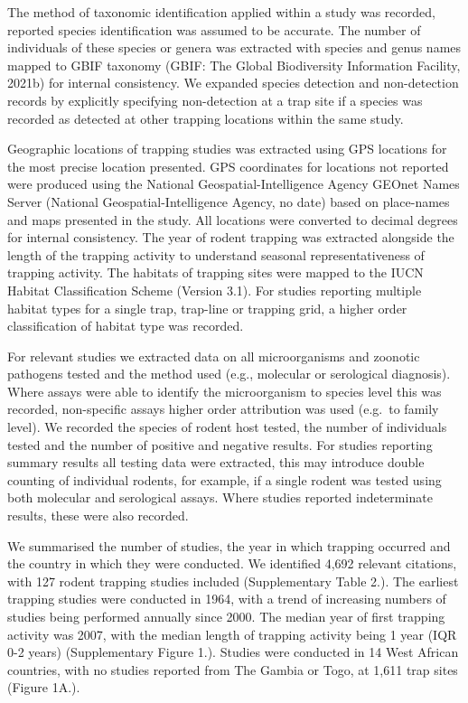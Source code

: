\documentclass[
]{article}
\begin{document}
The method of taxonomic identification applied within a study was
recorded, reported species identification was assumed to be accurate.
The number of individuals of these species or genera was extracted with
species and genus names mapped to GBIF taxonomy (GBIF: The Global
Biodiversity Information Facility, 2021b) for internal consistency. We
expanded species detection and non-detection records by explicitly
specifying non-detection at a trap site if a species was recorded as
detected at other trapping locations within the same study.

Geographic locations of trapping studies was extracted using GPS
locations for the most precise location presented. GPS coordinates for
locations not reported were produced using the National
Geospatial-Intelligence Agency GEOnet Names Server (National
Geospatial-Intelligence Agency, no date) based on place-names and maps
presented in the study. All locations were converted to decimal degrees
for internal consistency. The year of rodent trapping was extracted
alongside the length of the trapping activity to understand seasonal
representativeness of trapping activity. The habitats of trapping sites
were mapped to the IUCN Habitat Classification Scheme (Version 3.1). For
studies reporting multiple habitat types for a single trap, trap-line or
trapping grid, a higher order classification of habitat type was
recorded.

For relevant studies we extracted data on all microorganisms and
zoonotic pathogens tested and the method used (e.g., molecular or
serological diagnosis). Where assays were able to identify the
microorganism to species level this was recorded, non-specific assays
higher order attribution was used (e.g.~to family level). We recorded
the species of rodent host tested, the number of individuals tested and
the number of positive and negative results. For studies reporting
summary results all testing data were extracted, this may introduce
double counting of individual rodents, for example, if a single rodent
was tested using both molecular and serological assays. Where studies
reported indeterminate results, these were also recorded.

We summarised the number of studies, the year in which trapping occurred
and the country in which they were conducted. We identified 4,692
relevant citations, with 127 rodent trapping studies included
(Supplementary Table 2.). The earliest trapping studies were conducted
in 1964, with a trend of increasing numbers of studies being performed
annually since 2000. The median year of first trapping activity was
2007, with the median length of trapping activity being 1 year (IQR 0-2
years) (Supplementary Figure 1.). Studies were conducted in 14 West
African countries, with no studies reported from The Gambia or Togo, at
1,611 trap sites (Figure 1A.).
\end{document}
